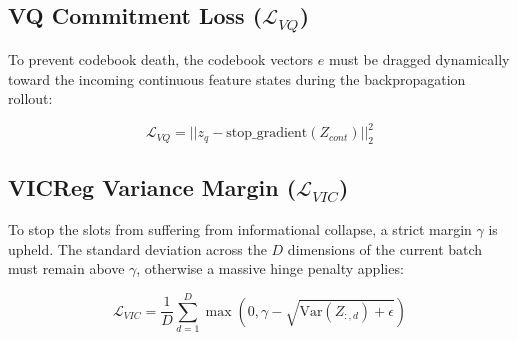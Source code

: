 \documentclass[11pt,a4paper]{article}
\begin{document}
\subsection{VQ Commitment Loss ($\mathcal{L}_{VQ}$)}
To prevent codebook death, the codebook vectors $e$ must be dragged dynamically toward the incoming continuous feature states during the backpropagation rollout:

\begin{equation}
\mathcal{L}_{VQ} = || z_q - \text{stop\_gradient}(Z_{cont}) ||_2^2
\end{equation}

\subsection{VICReg Variance Margin ($\mathcal{L}_{VIC}$)}
To stop the slots from suffering from informational collapse, a strict margin $\gamma$ is upheld. The standard deviation across the $D$ dimensions of the current batch must remain above $\gamma$, otherwise a massive hinge penalty applies:

\begin{equation}
\mathcal{L}_{VIC} = \frac{1}{D} \sum_{d=1}^D \max\left(0, \gamma - \sqrt{\text{Var}(Z_{:, d}) + \epsilon}\right)
\end{equation}
\end{document}
